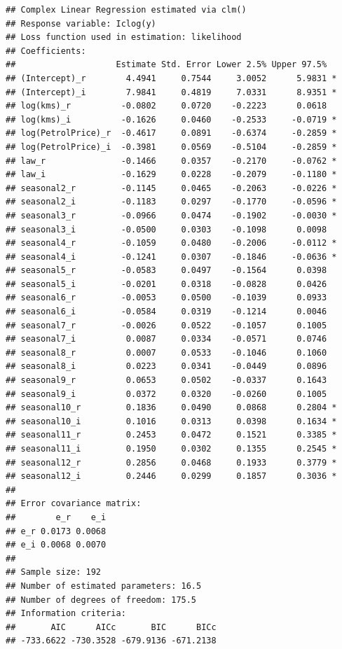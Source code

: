 \documentclass[
]{book}
\begin{document}
\begin{verbatim}
## Complex Linear Regression estimated via clm()
## Response variable: Iclog(y)
## Loss function used in estimation: likelihood
## Coefficients:
##                    Estimate Std. Error Lower 2.5% Upper 97.5%  
## (Intercept)_r        4.4941     0.7544     3.0052      5.9831 *
## (Intercept)_i        7.9841     0.4819     7.0331      8.9351 *
## log(kms)_r          -0.0802     0.0720    -0.2223      0.0618  
## log(kms)_i          -0.1626     0.0460    -0.2533     -0.0719 *
## log(PetrolPrice)_r  -0.4617     0.0891    -0.6374     -0.2859 *
## log(PetrolPrice)_i  -0.3981     0.0569    -0.5104     -0.2859 *
## law_r               -0.1466     0.0357    -0.2170     -0.0762 *
## law_i               -0.1629     0.0228    -0.2079     -0.1180 *
## seasonal2_r         -0.1145     0.0465    -0.2063     -0.0226 *
## seasonal2_i         -0.1183     0.0297    -0.1770     -0.0596 *
## seasonal3_r         -0.0966     0.0474    -0.1902     -0.0030 *
## seasonal3_i         -0.0500     0.0303    -0.1098      0.0098  
## seasonal4_r         -0.1059     0.0480    -0.2006     -0.0112 *
## seasonal4_i         -0.1241     0.0307    -0.1846     -0.0636 *
## seasonal5_r         -0.0583     0.0497    -0.1564      0.0398  
## seasonal5_i         -0.0201     0.0318    -0.0828      0.0426  
## seasonal6_r         -0.0053     0.0500    -0.1039      0.0933  
## seasonal6_i         -0.0584     0.0319    -0.1214      0.0046  
## seasonal7_r         -0.0026     0.0522    -0.1057      0.1005  
## seasonal7_i          0.0087     0.0334    -0.0571      0.0746  
## seasonal8_r          0.0007     0.0533    -0.1046      0.1060  
## seasonal8_i          0.0223     0.0341    -0.0449      0.0896  
## seasonal9_r          0.0653     0.0502    -0.0337      0.1643  
## seasonal9_i          0.0372     0.0320    -0.0260      0.1005  
## seasonal10_r         0.1836     0.0490     0.0868      0.2804 *
## seasonal10_i         0.1016     0.0313     0.0398      0.1634 *
## seasonal11_r         0.2453     0.0472     0.1521      0.3385 *
## seasonal11_i         0.1950     0.0302     0.1355      0.2545 *
## seasonal12_r         0.2856     0.0468     0.1933      0.3779 *
## seasonal12_i         0.2446     0.0299     0.1857      0.3036 *
## 
## Error covariance matrix:
##        e_r    e_i
## e_r 0.0173 0.0068
## e_i 0.0068 0.0070
## 
## Sample size: 192
## Number of estimated parameters: 16.5
## Number of degrees of freedom: 175.5
## Information criteria:
##       AIC      AICc       BIC      BICc 
## -733.6622 -730.3528 -679.9136 -671.2138
\end{verbatim}
\end{document}

